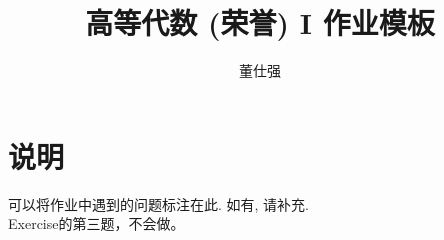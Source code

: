 \documentclass[11pt]{ctexart}
\title{高等代数 (荣誉) I 作业模板}
\author{董仕强}
\theoremstyle{definition}
\numberwithin{equation}{section}
\begin{document}
\maketitle

\section{说明}

可以将作业中遇到的问题标注在此. 如有, 请补充.\\
Exercise的第三题，不会做。



\end{document}
